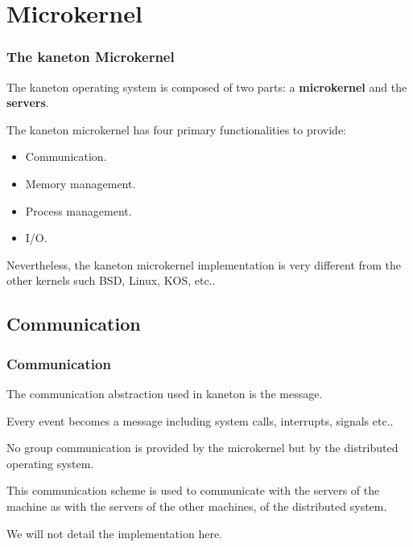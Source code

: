 \section{Microkernel}


\begin{frame}
  \frametitle{The kaneton Microkernel}

  The kaneton operating system is composed of two parts: a
  \textbf{microkernel} and the \textbf{servers}.

  \nl

  The kaneton microkernel has four primary functionalities
  to provide:

  \begin{itemize}[<+->]
    \item
      Communication.
    \item
      Memory management.
    \item
      Process management.
    \item
      I/O.
  \end{itemize}

  \nl

  Nevertheless, the kaneton microkernel implementation is very different
  from the other kernels such BSD, Linux, KOS, etc..
\end{frame}

%
%

\subsection{Communication}


\begin{frame}
  \frametitle{Communication}

  The communication abstraction used in kaneton is the message.

  \nl

  Every event becomes a message including system calls, interrupts,
  signals etc..

  \nl

  No group communication is provided by the microkernel but by the distributed
  operating system.

  \nl

  This communication scheme is used to communicate with the servers
  of the machine as with the servers of the other machines, of
  the distributed system.

  \nl

  We will not detail the implementation here.
\end{frame}

